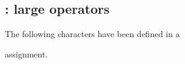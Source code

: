 \documentclass{book}
\begin{document}
\vfil\eject

\def\prevclass{}\def\prevfaml{}

\subsection{ : large operators}

The following characters have been defined
in a
\begin{disp}
\end{disp}
assignment.
\par\leavevmode\par
\end{document}
